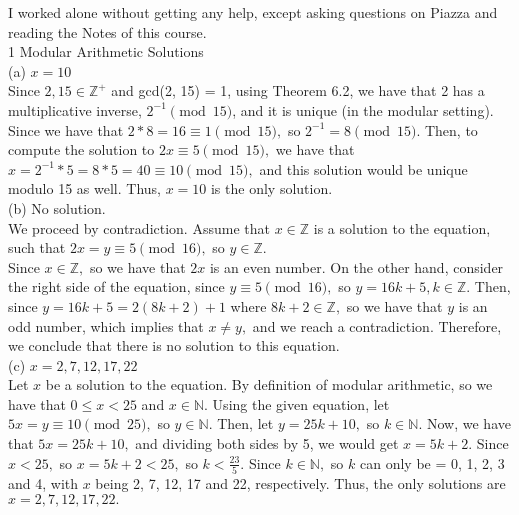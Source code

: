 \documentclass{article}
\begin{document}
I worked alone without getting any help, except asking questions on Piazza and reading the Notes of this course. \\[1cm]
{\Large 1 Modular Arithmetic Solutions} \\[.5cm]
(a) $x = 10$ \\[.3cm]
\indent Since $2, 15\in\mathbb{Z^+}$ and gcd(2, 15) = 1, using Theorem 6.2, we have that 2 has a multiplicative inverse, $2^{-1} \pmod{15}$, and it is unique (in the modular setting). Since we have that $2 * 8 = 16\equiv1 \pmod{15},$ so $2^{-1} = 8\pmod{15}.$ Then, to compute the solution to $2x\equiv5\pmod{15},$ we have that $x = 2^{-1} * 5 = 8 * 5 = 40\equiv10\pmod{15},$ and this solution would be unique modulo 15 as well. Thus, $x = 10$ is the only solution. \\[.5cm]
(b) No solution. \\[.3cm]
We proceed by contradiction. Assume that $x\in\mathbb{Z}$ is a solution to the equation, such that $2x = y\equiv5\pmod{16},$ so $y\in\mathbb{Z}.$\\[.1cm]
Since $x\in\mathbb{Z},$ so we have that $2x$ is an even number. On the other hand, consider the right side of the equation, since $y\equiv5\pmod{16},$ so $y = 16k + 5, k\in\mathbb{Z}.$ Then, since $y = 16k + 5 = 2(8k+2) + 1$ where $8k+2\in\mathbb{Z},$ so we have that $y$ is an odd number, which implies that $x\neq y,$ and we reach a contradiction. Therefore, we conclude that there is no solution to this equation. \\[.5cm]
(c) $x = 2, 7, 12, 17, 22$ \\[.3cm]
\indent Let $x$ be a solution to the equation. By definition of modular arithmetic, so we have that $0\leq x < 25$ and $x\in\mathbb{N}$. Using the given equation, let $5x = y\equiv10\pmod{25},$ so $y\in\mathbb{N}.$ Then, let $y = 25k + 10,$ so $k\in\mathbb{N}.$ Now, we have that $5x = 25k + 10,$ and dividing both sides by 5, we would get $x = 5k + 2.$ Since $x < 25,$ so $x = 5k + 2 < 25,$ so $k < \frac{23}{5}.$ Since $k\in\mathbb{N},$ so $k$ can only be = 0, 1, 2, 3 and 4, with $x$ being 2, 7, 12, 17 and 22, respectively. Thus, the only solutions are $x = 2, 7, 12, 17, 22.$
\end{document}
